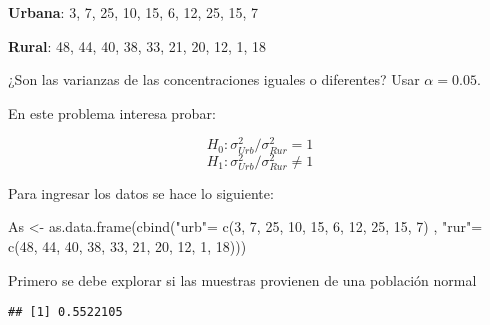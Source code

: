 \documentclass[
]{article}
\newenvironment{Shaded}{}{}
\newcommand{\DecValTok}[1]{\textcolor[rgb]{0.25,0.63,0.44}{#1}}
\newcommand{\FunctionTok}[1]{\textcolor[rgb]{0.02,0.16,0.49}{#1}}
\newcommand{\NormalTok}[1]{#1}
\newcommand{\OtherTok}[1]{\textcolor[rgb]{0.00,0.44,0.13}{#1}}
\newcommand{\SpecialCharTok}[1]{\textcolor[rgb]{0.25,0.44,0.63}{#1}}
\newcommand{\StringTok}[1]{\textcolor[rgb]{0.25,0.44,0.63}{#1}}
\begin{document}
\textbf{Urbana}: 3, 7, 25, 10, 15, 6, 12, 25, 15, 7

\textbf{Rural}: 48, 44, 40, 38, 33, 21, 20, 12, 1, 18

¿Son las varianzas de las concentraciones iguales o diferentes? Usar
\(\alpha=0.05\).

En este problema interesa probar:

\[H_0: \sigma_{Urb}^2 / \sigma_{Rur}^2 = 1\]
\[H_1: \sigma_{Urb}^2 / \sigma_{Rur}^2 \neq 1\]

Para ingresar los datos se hace lo siguiente:

\begin{Shaded}
\begin{Highlighting}[]
\NormalTok{As }\OtherTok{\textless{}{-}} \FunctionTok{as.data.frame}\NormalTok{(}\FunctionTok{cbind}\NormalTok{(}\StringTok{"urb"}\OtherTok{=} \FunctionTok{c}\NormalTok{(}\DecValTok{3}\NormalTok{, }\DecValTok{7}\NormalTok{, }\DecValTok{25}\NormalTok{, }\DecValTok{10}\NormalTok{, }\DecValTok{15}\NormalTok{, }\DecValTok{6}\NormalTok{, }\DecValTok{12}\NormalTok{, }\DecValTok{25}\NormalTok{, }\DecValTok{15}\NormalTok{, }\DecValTok{7}\NormalTok{) ,}
                         \StringTok{"rur"}\OtherTok{=} \FunctionTok{c}\NormalTok{(}\DecValTok{48}\NormalTok{, }\DecValTok{44}\NormalTok{, }\DecValTok{40}\NormalTok{, }\DecValTok{38}\NormalTok{, }\DecValTok{33}\NormalTok{, }\DecValTok{21}\NormalTok{, }\DecValTok{20}\NormalTok{, }\DecValTok{12}\NormalTok{, }\DecValTok{1}\NormalTok{, }\DecValTok{18}\NormalTok{)))}
\end{Highlighting}
\end{Shaded}

Primero se debe explorar si las muestras provienen de una población
normal

\begin{Shaded}
\end{Shaded}

\begin{verbatim}
## [1] 0.5522105
\end{verbatim}

\begin{Shaded}
\end{Shaded}
\end{document}
